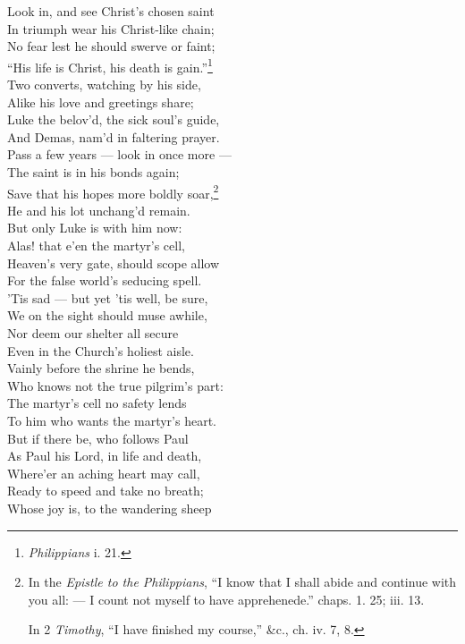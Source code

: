   Look in, and see Christ’s chosen saint \\
 In triumph wear his Christ-like chain; \\
 No fear lest he should swerve or faint; \\
 “His life is Christ, his death is gain.”\footnote{\emph{Philippians} i. 21.} \\
  Two converts, watching by his side, \\
 Alike his love and greetings share; \\
 Luke the belov’d, the sick soul’s guide, \\
 And Demas, nam’d in faltering prayer. \\
  Pass a few years — look in once more — \\
 The saint is in his bonds again; \\
 Save that his hopes more boldly soar,\footnote{In the \emph{Epistle to the Philippians}, “I know that I shall abide and continue with you all: — I count not myself to have apprehenede.” chaps. 1. 25; iii. 13. \par In 2 \emph{Timothy}, “I have finished my course,” \&c., ch. iv. 7, 8.} \\
 He and his lot unchang’d remain. \\
  But only Luke is with him now: \\
 Alas! that e’en the martyr’s cell, \\
 Heaven’s very gate, should scope allow \\
 For the false world’s seducing spell. \\
  ’Tis sad — but yet ’tis well, be sure, \\
 We on the sight should muse awhile, \\
 Nor deem our shelter all secure \\
 Even in the Church’s holiest aisle. \\
  Vainly before the shrine he bends, \\
 Who knows not the true pilgrim’s part: \\
 The martyr’s cell no safety lends \\
 To him who wants the martyr’s heart. \\
  But if there be, who follows Paul \\
 As Paul his Lord, in life and death, \\
 Where’er an aching heart may call, \\
 Ready to speed and take no breath; \\
  Whose joy is, to the wandering sheep \\
